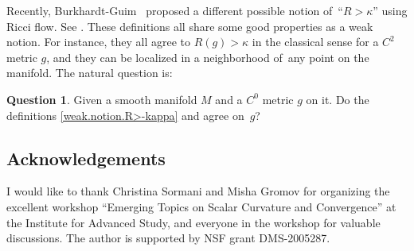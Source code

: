 \documentclass[pdftex]{sigma}
\numberwithin{equation}{section}
\theoremstyle{definition}
\newtheorem{quest}[prop]{Question}
\begin{document}
Recently, Burkhardt-Guim~\cite{burkhardt-guim2019pointwise} proposed a different possible notion of~``$R>\kappa$'' using Ricci flow. See \cite[Definition~1.2]{burkhardt-guim2019pointwise}. These definitions all share some good properties as a weak notion. For instance, they all agree to $R(g)>\kappa$ in the classical sense for a $C^2$ metric $g$, and they can be localized in a neighborhood of~any point on the manifold. The natural question is:

\begin{quest}\label{question.different.definitions}
Given a smooth manifold $M$ and a $C^0$ metric $g$ on it. Do the definitions \eqref{weak.notion.R>-kappa} and \cite[Definition~1.2]{burkhardt-guim2019pointwise} agree on~$g$?
\end{quest}

\subsection*{Acknowledgements}

I would like to thank Christina Sormani and Misha Gromov for organizing the excellent workshop ``Emerging Topics on Scalar Curvature and Convergence'' at the Institute for Advanced Study, and everyone in the workshop for valuable discussions. The author is supported by NSF grant DMS-2005287.
\end{document}

